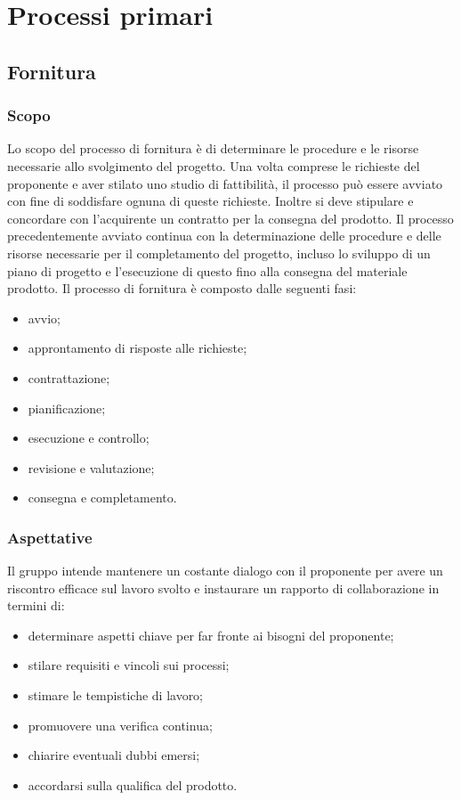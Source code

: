 \section{Processi primari}

\subsection{Fornitura}
\subsubsection{Scopo}
Lo scopo del processo di fornitura è di determinare le procedure e le risorse necessarie allo svolgimento del progetto. Una volta comprese le richieste del proponente e aver stilato uno studio di fattibilità, il processo può essere avviato con fine di soddisfare ognuna di queste richieste. Inoltre si deve stipulare e concordare con l'acquirente un contratto per la consegna del prodotto.
Il processo precedentemente avviato continua con la determinazione delle procedure e delle risorse necessarie per il completamento del progetto, incluso lo sviluppo di un piano di progetto e l'esecuzione di questo fino alla consegna del materiale prodotto.
	Il processo di fornitura è composto dalle seguenti fasi:
	\begin{itemize}
		\item avvio;
		\item approntamento di risposte alle richieste;
		\item contrattazione;
		\item pianificazione;
		\item esecuzione e controllo;
		\item revisione e valutazione;
		\item consegna e completamento.
	\end{itemize}
	\subsubsection{Aspettative}
	Il gruppo intende mantenere un costante dialogo con il proponente per avere un riscontro efficace sul lavoro svolto e instaurare un rapporto di collaborazione in termini di:
	\begin{itemize}
		\item determinare aspetti chiave per far fronte ai bisogni del proponente;
		\item stilare requisiti e vincoli sui processi;
		\item stimare le tempistiche di lavoro;
		\item promuovere una verifica continua;
		\item chiarire eventuali dubbi emersi;
		\item accordarsi sulla qualifica del prodotto.
	\end{itemize}
